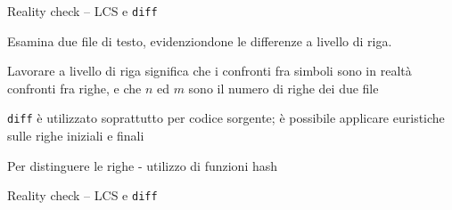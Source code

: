 \begin{frame}{Reality check -- LCS e \texttt{diff}  }

\BIL
\item Esamina due file di testo, evidenziondone le differenze a livello di riga. 
\item Lavorare \alert{a livello di riga} significa che i confronti fra simboli sono in realtà confronti fra righe, e che $n$ ed $m$ sono il numero di righe dei due file
\EIL

\BIL
\item \texttt{diff} è utilizzato soprattutto per codice sorgente; è possibile applicare euristiche sulle righe iniziali e finali
\item Per distinguere le righe - utilizzo di funzioni hash
\EIL

\end{frame}

\begin{frame}{Reality check -- LCS e \texttt{diff}  }


\end{frame}






